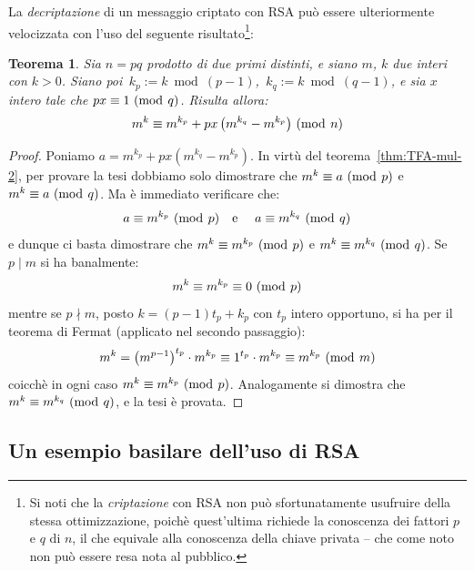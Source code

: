\documentclass[pdflatex,11pt,a4paper,oneside]{article}
\let\OldEmph\emph
\renewcommand{\emph}[1]{\OldEmph{#1\/}}
\newcommand{\p}[1]{\left({#1}\right)}
\newcommand{\divides}[0]{\mid}
\newcommand{\notdivides}[0]{\nmid}
\newcommand{\congruent}[0]{\equiv}
\newcommand{\mmodop}[0]{\ensuremath{\operatorname{mod}}}
\newcommand{\mmod}[1]{\ensuremath{\allowbreak\ (\mmodop\:{#1})}}
\newcommand{\rem}[2]{\ensuremath{{#1}\:\mmodop\:{#2}}}
\newtheorem{theorem}[TheoremLike]{Teorema}
\begin{document}
La \emph{decriptazione} di un messaggio criptato con RSA pu\`o essere
ulteriormente velocizzata con l'uso del seguente risultato\footnote{Si
noti che la \emph{criptazione} con RSA non pu\`o sfortunatamente
usufruire della stessa ottimizzazione, poich\`e quest'ultima richiede
la conoscenza dei fattori $p$ e $q$ di $n$, il che equivale alla
conoscenza della chiave privata -- che come noto non pu\`o essere resa
nota al pubblico.}:
%
\begin{theorem}\label{thm:modular-exponentation-rsa-optimization}
Sia $n = pq$ prodotto di due primi distinti, e siano $m$, $k$ due
interi con $k > 0$.  Siano poi \,$k_p := \rem{k}{(p-1)}$,
\,$k_q := \rem{k}{(q-1)}$, e sia $x$ intero tale che
$px \congruent 1 \mmod q$. Risulta allora:
\begin{displaymath}
  m^k \congruent m^{k_p} + px\,\big(m^{k_q} - m^{k_p}\big)\mmod n
\end{displaymath}
\end{theorem}
%
\begin{proof}
Poniamo $a = m^{k_p} + px\p{m^{k_q} - m^{k_p}}$.  In virt\`u del
teorema~\eqref{thm:TFA-mul-2}, per provare la tesi dobbiamo solo
dimostrare che $m^k \congruent a \mmod p$ e $m^k \congruent a \mmod q$.
Ma \`e immediato verificare che:
\begin{displaymath}
  a \congruent m^{k_p} \mmod p
    \text{\quad e \quad}
  a \congruent m^{k_q} \mmod q
\end{displaymath}
e dunque ci basta dimostrare che $m^k \congruent m^{k_p} \mmod p$ e
$m^k \congruent m^{k_q} \mmod q$. Se $p \divides m$ si ha banalmente:
\begin{displaymath}
  m^k \congruent m^{k_p} \congruent 0 \mmod p
\end{displaymath}
mentre se $p \notdivides m$, posto $k = (p - 1)t_p + k_p$ con $t_p$ intero
opportuno, si ha per il teorema di Fermat (applicato nel secondo
passaggio):
\begin{displaymath}
  m^k = \p{m^{p-1}}^{t_p} \cdot m^{k_p} \congruent 1^{t_p} \cdot m^{k_p}
      \congruent m^{k_p} \mmod m
\end{displaymath}
coicch\`e in ogni caso $m^k \congruent m^{k_p} \mmod p$. Analogamente si
dimostra che $m^k \congruent m^{k_q} \mmod q$, e la tesi \`e provata.
\end{proof}

\subsection{Un esempio basilare dell'uso di RSA}
\end{document}
